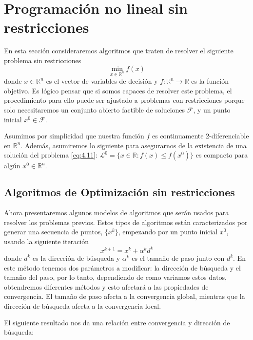 \section{Programación no lineal sin restricciones}

En esta sección consideraremos algoritmos que traten de resolver el siguiente problema sin restricciones
\begin{equation}
\min_{x\in\mathbb{R}^n}f(x) 
\label{eq:4.11}
\end{equation}
donde $x\in\mathbb{R}^n$ es el vector de variables de decisión y $f:\mathbb{R}^n\xrightarrow{}{}\mathbb{R}$ es la función objetivo. 
Es lógico pensar que si somos capaces de resolver este problema, el procedimiento para ello puede ser ajustado a problemas con restricciones porque solo necesitaremos un conjunto abierto factible de soluciones $\mathcal{F}$, y un punto inicial $x^0\in\mathcal{F}$.

Asumimos por simplicidad que nuestra función $f$ es continuamente 2-diferenciable en $\mathbb{R}^n$. 
Además, asumiremos lo siguiente para asegurarnos de la existencia de una solución del problema \ref{eq:4.11}: $\mathcal{L}^0 = \{x\in\mathbb{R}:f(x)\leq f(x^0)\}$ es compacto para algún $x^0\in\mathbb{R}^n$.

\subsection{Algoritmos de Optimización sin restricciones}

Ahora presentaremos algunos modelos de algoritmos que serán usados para resolver los problemas previos. 
Estos tipos de algoritmos están caracterizados por generar una secuencia de puntos, $\{x^k\}$, empezando por un punto inicial $x^0$, usando la siguiente iteración
\begin{equation}
x^{k+1} = x^k + \alpha^kd^k
\label{eq:4.12}
\end{equation}
donde $d^k$ es la dirección de búsqueda y $\alpha^k$ es el tamaño de paso junto con $d^k$. 
En este método tenemos dos parámetros a modificar: la dirección de búsqueda y el tamaño del paso, por lo tanto, dependiendo de como variamos estos datos, obtendremos diferentes métodos y esto afectará a las propiedades de convergencia. 
El tamaño de paso afecta a la convergencia global, mientras que la dirección de búsqueda afecta a la convergencia local. 

El siguiente resultado nos da una relación entre convergencia y dirección de búsqueda:

